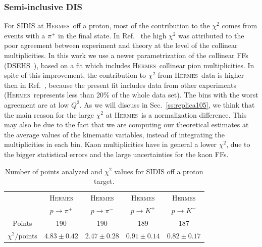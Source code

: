 \documentclass[aps,preprintnumbers,showpacs,nofootinbib,superscriptaddress,floatfix]{revtex4}
\newcommand{\hermes}{\textsc{Hermes}}
\begin{document}
\subsubsection*{Semi-inclusive DIS}
\label{sss:SIDIS_agreement}


For SIDIS at \hermes\ off a proton, 
most of the contribution to the $\chi^2$ comes from events with a $\pi^+$ in the final state. 
In Ref.~\cite{Signori:2013mda} the high $\chi^2$ was attributed to the
poor agreement between experiment and theory at
the level of the collinear multiplicities. 
In this work we use a newer parametrization of the collinear FFs
(DSEHS~\cite{deFlorian:2014xna}), based on a fit which includes \hermes\
collinear pion multiplicities.  In spite of this improvement, the
contribution to $\chi^2$ from \hermes\ data is higher then in
Ref.~\cite{Signori:2013mda}, because the
present fit includes data from other experiments (\hermes\ represents less
than 20\% of the whole data set).
The bins with the worst agreement are at low $Q^2$. As we will discuss in
Sec.~\ref{ss:replica105}, we think that the main reason for the large $\chi^2$
at \hermes\ is a normalization difference. This may also be due to the fact
that we are computing our theoretical estimates at the average values of the
kinematic variables, instead of integrating the multiplicities in each bin. 
Kaon multiplicities have in general a lower $\chi^2$, due to the bigger
statistical errors and the large
uncertainties for the kaon FFs. 

\begin{table}[h!]
\begin{center}
\begin{tabular}{|c|c|c|c|c|}
 \hline
\hline
  & \hermes & \hermes & \hermes & \hermes \\   
 &  $p \to \pi^+$    &   $p \to \pi^-$    &  $p \to K^+$    &   $p \to K^-$
 \\
 \hline
 Points         &  190 & 190 & 189 & 187       \\
 \hline
$\chi^2 /$points & $4 .83\pm 0.42$ & $2 .47\pm 0.28$ & $0 .91\pm 0.14$ & $0 .82\pm 0.17$   \\            
\hline
\hline
\end{tabular}
\caption{Number of points analyzed and $\chi^2$ values for SIDIS off a proton target.}
\label{t:fl_ind_chi2_eP}
\end{center}
\end{table}
\end{document}
